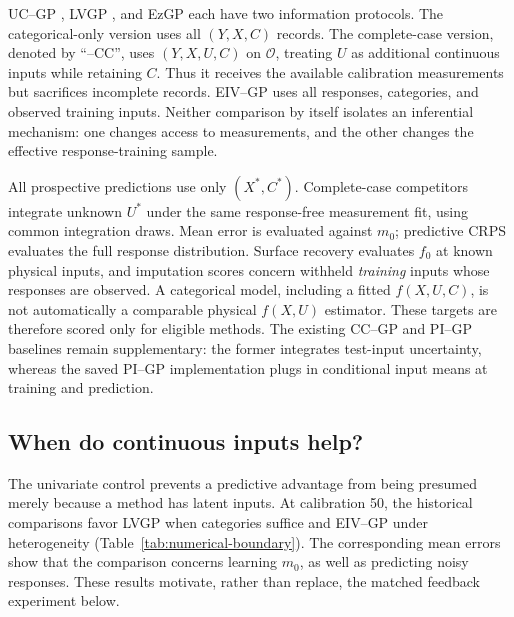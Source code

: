 UC--GP \citep{qian2008gaussian,zhou2011simple}, LVGP \citep{zhang2020latent}, and EzGP \citep{xiao2021ezgp} each have two information protocols. The categorical-only version uses all $(Y,X,C)$ records. The complete-case version, denoted by ``--CC'', uses $(Y,X,U,C)$ on $\mathcal O$, treating $U$ as additional continuous inputs while retaining $C$. Thus it receives the available calibration measurements but sacrifices incomplete records. EIV--GP uses all responses, categories, and observed training inputs. Neither comparison by itself isolates an inferential mechanism: one changes access to measurements, and the other changes the effective response-training sample.

All prospective predictions use only $(X^*,C^*)$. Complete-case competitors integrate unknown $U^*$ under the same response-free measurement fit, using common integration draws. Mean error is evaluated against $m_0$; predictive CRPS evaluates the full response distribution. Surface recovery evaluates $f_0$ at known physical inputs, and imputation scores concern withheld \emph{training} inputs whose responses are observed. A categorical model, including a fitted $f(X,U,C)$, is not automatically a comparable physical $f(X,U)$ estimator. These targets are therefore scored only for eligible methods. The existing CC--GP and PI--GP baselines remain supplementary: the former integrates test-input uncertainty, whereas the saved PI--GP implementation plugs in conditional input means at training and prediction.

\subsection{When do continuous inputs help?}
The univariate control prevents a predictive advantage from being presumed merely because a method has latent inputs. At calibration 50, the historical comparisons favor LVGP when categories suffice and EIV--GP under heterogeneity (Table~\ref{tab:numerical-boundary}). The corresponding mean errors show that the comparison concerns learning $m_0$, as well as predicting noisy responses. These results motivate, rather than replace, the matched feedback experiment below.

